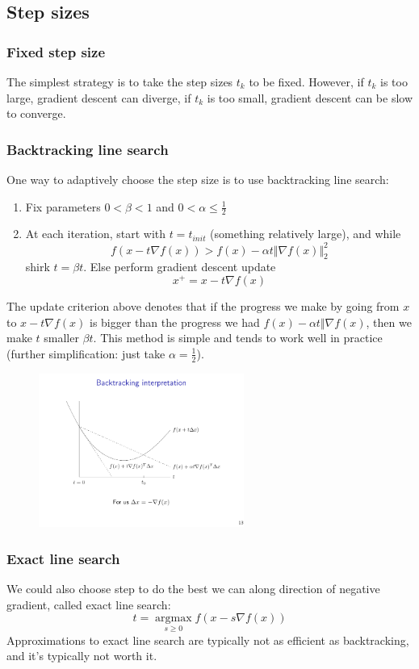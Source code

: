 \documentclass[a4paper]{article}
\begin{document}
{\subsection{Step sizes}
\subsubsection{Fixed step size}
The simplest strategy is to take the step sizes $t_k$ to be fixed. However, if $t_k$ is too large, gradient descent can diverge, if $t_k$ is too small, gradient descent can be slow to converge.
\subsubsection{Backtracking line search}
One way to adaptively choose the step size is to use backtracking line search:
\begin{enumerate}
  \item Fix parameters $0 < \beta < 1$ and $0 < \alpha \leq \tfrac{1}{2}$
  \item At each iteration, start with $t = t_{init}$ (something relatively large), and while 
  \[
  f(x-t \nabla f(x)) > f(x) - \alpha t \Vert \nabla f(x) \Vert_2^2 \nonumber
  \]
  shirk $t = \beta t$. Else perform gradient descent update
  \[
  x^+ = x - t \nabla f(x)
  \] 
\end{enumerate}
The update criterion above denotes that if the progress we make by going from $x$ to $x - t\nabla f(x)$ is bigger than the progress we had $f(x) - \alpha t \Vert \nabla f(x)$, then we make $t$ smaller $\beta t$. This method is simple and tends to work well in practice (further simplification: just take $\alpha = \tfrac{1}{2}$).
\begin{figure}[htbp] 
  \centering 
  \includegraphics[width=0.6\textwidth]{img/backtracking_line_search.pdf} 
\end{figure}

\subsubsection{Exact line search}
We could also choose step to do the best we can along direction of negative gradient, called exact line search:
\begin{equation}
  t = \mathop{\arg\max}\limits_{s \geq 0} f(x - s\nabla f(x)) \nonumber
\end{equation}
Approximations to exact line search are typically not as efficient as backtracking, and it's typically not worth it.

}
\end{document}
